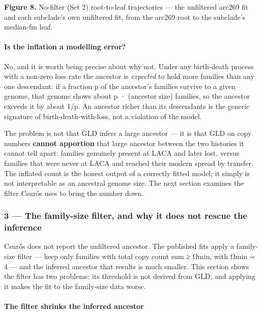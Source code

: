 \documentclass[
  10pt,
]{article}
\begin{document}
\textbf{Figure 8.} No-filter (Set 2) root-to-leaf trajectories --- the
unfiltered arc269 fit and each subclade's own unfiltered fit, from the
arc269 root to the subclade's median-fm leaf.

\paragraph{Is the inflation a modelling
error?}\label{is-the-inflation-a-modelling-error}

No, and it is worth being precise about why not. Under any birth-death
process with a non-zero loss rate the ancestor is \emph{expected} to
hold more families than any one descendant: if a fraction p of the
ancestor's families survive to a given genome, that genome shows about p
· (ancestor size) families, so the ancestor exceeds it by about 1/p. An
ancestor richer than its descendants is the generic signature of
birth-death-with-loss, not a violation of the model.

The problem is not that GLD infers a large ancestor --- it is that GLD
on copy numbers \textbf{cannot apportion} that large ancestor between
the two histories it cannot tell apart: families genuinely present at
LACA and later lost, versus families that were never at LACA and reached
their modern spread by transfer. The inflated count is the honest output
of a correctly fitted model; it simply is not interpretable as an
ancestral genome size. The next section examines the filter Csurős uses
to bring the number down.

\subsubsection{3 --- The family-size filter, and why it does not rescue
the
inference}\label{3--the-family-size-filter-and-why-it-does-not-rescue-the-inference}

Csurős does not report the unfiltered ancestor. The published fits apply
a family-size filter --- keep only families with total copy count sum ≥
Ωmin, with Ωmin = 4 --- and the inferred ancestor that results is much
smaller. This section shows the filter has two problems: its threshold
is not derived from GLD, and applying it makes the fit to the
family-size data worse.

\paragraph{The filter shrinks the inferred
ancestor}\label{the-filter-shrinks-the-inferred-ancestor}
\end{document}
